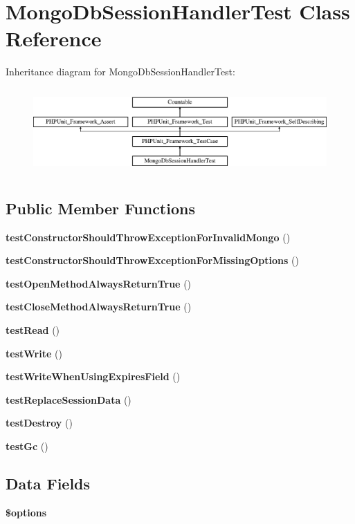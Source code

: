 \section{Mongo\+Db\+Session\+Handler\+Test Class Reference}
\label{class_symfony_1_1_component_1_1_http_foundation_1_1_tests_1_1_session_1_1_storage_1_1_handler_1_1_mongo_db_session_handler_test}
Inheritance diagram for Mongo\+Db\+Session\+Handler\+Test\+:\begin{figure}[H]
\begin{center}
\leavevmode
\includegraphics[height=3.303835cm]{class_symfony_1_1_component_1_1_http_foundation_1_1_tests_1_1_session_1_1_storage_1_1_handler_1_1_mongo_db_session_handler_test}
\end{center}
\end{figure}
\subsection*{Public Member Functions}
\begin{DoxyCompactItemize}
\item 
{\bf test\+Constructor\+Should\+Throw\+Exception\+For\+Invalid\+Mongo} ()
\item 
{\bf test\+Constructor\+Should\+Throw\+Exception\+For\+Missing\+Options} ()
\item 
{\bf test\+Open\+Method\+Always\+Return\+True} ()
\item 
{\bf test\+Close\+Method\+Always\+Return\+True} ()
\item 
{\bf test\+Read} ()
\item 
{\bf test\+Write} ()
\item 
{\bf test\+Write\+When\+Using\+Expires\+Field} ()
\item 
{\bf test\+Replace\+Session\+Data} ()
\item 
{\bf test\+Destroy} ()
\item 
{\bf test\+Gc} ()
\end{DoxyCompactItemize}
\subsection*{Data Fields}
\begin{DoxyCompactItemize}
\item 
{\bf \$options}
\end{DoxyCompactItemize}
